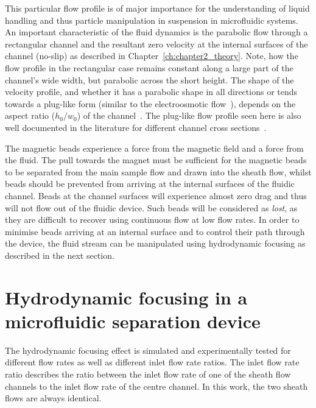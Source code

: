 This particular flow profile is of major importance for the understanding of liquid handling and thus particle manipulation in suspension in microfluidic systems. An important characteristic of the fluid dynamics is the parabolic flow through a rectangular channel and the resultant zero velocity at the internal surfaces of the channel (no-slip) as described in Chapter~\ref{ch:chapter2_theory}. Note, how the flow profile in the rectangular case remains constant along a large part of the channel's wide width, but parabolic across the short height. The shape of the velocity profile, and whether it has a parabolic shape in all directions or tends towards a plug-like form (similar to the electroosmotic flow~\cite{Yang2005}), depends on the aspect ratio ($h_{0}/w_{0}$) of the channel~\cite{Lee2006}. The plug-like flow profile seen here is also well documented in the literature for different channel cross sections~\cite{White2006,Bruus2007}. 

The magnetic beads experience a force from the magnetic field and a force from the fluid. The pull towards the magnet must be sufficient for the magnetic beads to be separated from the main sample flow and drawn into the sheath flow, whilst beads should be prevented from arriving at the internal surfaces of the fluidic channel. Beads at the channel surfaces will experience almost zero drag and thus will not flow out of the fluidic device. Such beads will be considered as \textit{lost}, as they are difficult to recover using continuous flow at low flow rates. In order to minimise beads arriving at an internal surface and to control their path through the device, the fluid stream can be manipulated using hydrodynamic focusing as described in the next section.

\section{Hydrodynamic focusing in a microfluidic separation device}\label{sec:hydrodynamicFocusingInAMicrofluidicSeparationDevice}
The hydrodynamic focusing effect is simulated and experimentally tested for different flow rates as well as different inlet flow rate ratios.  The inlet flow rate ratio describes the ratio between the inlet flow rate of one of the sheath flow channels to the inlet flow rate of the centre channel. In this work, the two sheath flows are always identical. 

